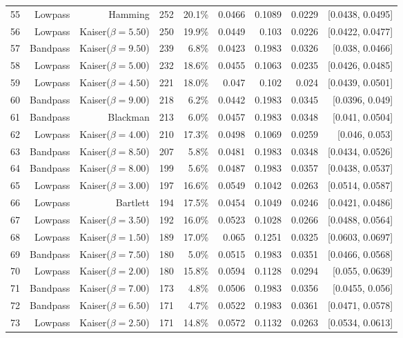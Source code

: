 \begin{longtable}{lrrrrrrrr}
    55 & Lowpass & Hamming & 252 & 20.1\% & 0.0466 & 0.1089 & 0.0229 & [0.0438, 0.0495] \\
    56 & Lowpass & Kaiser($\beta=5.50$) & 250 & 19.9\% & 0.0449 & 0.103 & 0.0226 & [0.0422, 0.0477] \\
    57 & Bandpass & Kaiser($\beta=9.50$) & 239 & 6.8\% & 0.0423 & 0.1983 & 0.0326 & [0.038, 0.0466] \\
    58 & Lowpass & Kaiser($\beta=5.00$) & 232 & 18.6\% & 0.0455 & 0.1063 & 0.0235 & [0.0426, 0.0485] \\
    59 & Lowpass & Kaiser($\beta=4.50$) & 221 & 18.0\% & 0.047 & 0.102 & 0.024 & [0.0439, 0.0501] \\
    60 & Bandpass & Kaiser($\beta=9.00$) & 218 & 6.2\% & 0.0442 & 0.1983 & 0.0345 & [0.0396, 0.049] \\
    61 & Bandpass & Blackman & 213 & 6.0\% & 0.0457 & 0.1983 & 0.0348 & [0.041, 0.0504] \\
    62 & Lowpass & Kaiser($\beta=4.00$) & 210 & 17.3\% & 0.0498 & 0.1069 & 0.0259 & [0.046, 0.053] \\
    63 & Bandpass & Kaiser($\beta=8.50$) & 207 & 5.8\% & 0.0481 & 0.1983 & 0.0348 & [0.0434, 0.0526] \\
    64 & Bandpass & Kaiser($\beta=8.00$) & 199 & 5.6\% & 0.0487 & 0.1983 & 0.0357 & [0.0438, 0.0537] \\
    65 & Lowpass & Kaiser($\beta=3.00$) & 197 & 16.6\% & 0.0549 & 0.1042 & 0.0263 & [0.0514, 0.0587] \\
    66 & Lowpass & Bartlett & 194 & 17.5\% & 0.0454 & 0.1049 & 0.0246 & [0.0421, 0.0486] \\
    67 & Lowpass & Kaiser($\beta=3.50$) & 192 & 16.0\% & 0.0523 & 0.1028 & 0.0266 & [0.0488, 0.0564] \\
    68 & Lowpass & Kaiser($\beta=1.50$) & 189 & 17.0\% & 0.065 & 0.1251 & 0.0325 & [0.0603, 0.0697] \\
    69 & Bandpass & Kaiser($\beta=7.50$) & 180 & 5.0\% & 0.0515 & 0.1983 & 0.0351 & [0.0466, 0.0568] \\
    70 & Lowpass & Kaiser($\beta=2.00$) & 180 & 15.8\% & 0.0594 & 0.1128 & 0.0294 & [0.055, 0.0639] \\
    71 & Bandpass & Kaiser($\beta=7.00$) & 173 & 4.8\% & 0.0506 & 0.1983 & 0.0356 & [0.0455, 0.056] \\
    72 & Bandpass & Kaiser($\beta=6.50$) & 171 & 4.7\% & 0.0522 & 0.1983 & 0.0361 & [0.0471, 0.0578] \\
    73 & Lowpass & Kaiser($\beta=2.50$) & 171 & 14.8\% & 0.0572 & 0.1132 & 0.0263 & [0.0534, 0.0613] \\

\end{longtable}
